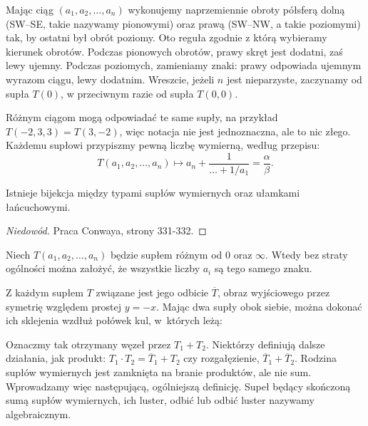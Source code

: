 Mając ciąg $(a_1, a_2, \ldots, a_n)$ wykonujemy naprzemiennie obroty półsferą dolną (SW--SE, takie nazywamy pionowymi) oraz prawą (SW--NW, a takie poziomymi) tak, by ostatni był obrót poziomy.
Oto reguła zgodnie z którą wybieramy kierunek obrotów.
Podczas pionowych obrotów, prawy skręt jest dodatni, zaś lewy ujemny.
Podczas poziomych, zamieniamy znaki: prawy odpowiada ujemnym wyrazom ciągu, lewy dodatnim.
Wreszcie, jeżeli $n$ jest nieparzyste, zaczynamy od supła $T(0)$, w przeciwnym razie od supła $T(0, 0)$.

Różnym ciągom mogą odpowiadać te same supły, na przykład $T(-2, 3, 3) = T(3, -2)$, więc notacja nie jest jednoznaczna, ale to nic złego.
Każdemu supłowi przypiszmy pewną liczbę wymierną, według przepisu:
\begin{equation}
    T(a_1, a_2, \ldots, a_n) \mapsto a_n + \frac{1}{\ldots + 1/a_1} = \frac \alpha \beta.
\end{equation}

\begin{proposition}
    Istnieje bijekcja między typami supłów wymiernych oraz ułamkami łańcuchowymi.
\end{proposition}

\begin{proof}[Niedowód]
    Praca \cite{conway70} Conwaya, strony 331-332.
\end{proof}

\begin{proposition}
    \label{prp:continued_fractions}
    Niech $T(a_1, a_2, \ldots, a_n)$ będzie supłem różnym od $0$ oraz $\infty$.
    Wtedy bez straty ogólności można założyć, że wszystkie liczby $a_i$ są tego samego znaku.
\end{proposition}

Z każdym supłem $T$ związane jest jego odbicie $\overline T$, obraz wyjściowego przez symetrię względem prostej $y = -x$.
Mając dwa supły obok siebie, można dokonać ich sklejenia wzdłuż połówek kul, w~których leżą:


Oznaczmy tak otrzymany węzeł przez $T_1 + T_2$.
Niektórzy definiują dalsze działania, jak produkt: $T_1 \cdot T_2 = \overline T_1 + T_2$ czy rozgałęzienie, $\overline T_1 + \overline T_2$.
Rodzina supłów wymiernych jest zamknięta na branie produktów, ale nie sum.
Wprowadzamy więc następującą, ogólniejszą definicję.
Supeł będący skończoną sumą supłów wymiernych, ich luster, odbić lub odbić luster nazywamy algebraicznym.

